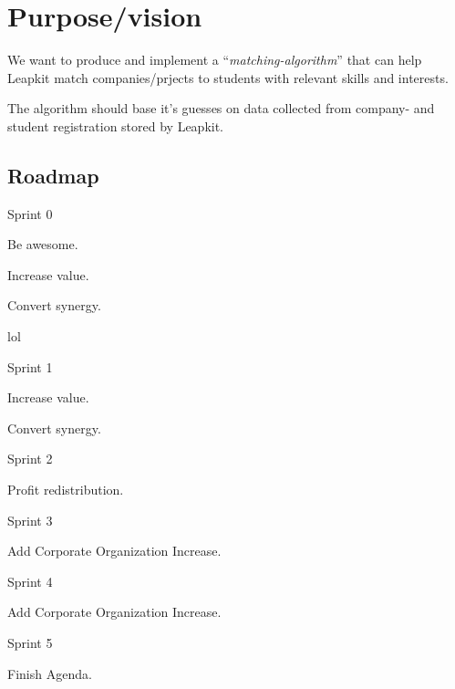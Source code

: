 \section{Purpose/vision}

We want to produce and implement a ``\emph{matching-algorithm}'' that can help
Leapkit match companies/prjects to students with relevant skills and interests.

The algorithm should base it's guesses on data collected from company- and student registration stored by Leapkit.

\subsection{Roadmap}
\begin{itemize*}
  \item Sprint 0
        \begin{enumerate*}
          \item Be awesome.
          \item Increase value.
          \item Convert synergy.
          \item lol
        \end{enumerate*}
  \item Sprint 1
        \begin{enumerate*}
          \item Increase value.
          \item Convert synergy.
        \end{enumerate*}
  \item Sprint 2
        \begin{enumerate*}
          \item Profit redistribution.
        \end{enumerate*}
  \item Sprint 3
        \begin{enumerate*}
          \item Add Corporate Organization Increase.
        \end{enumerate*}
  \item Sprint 4
        \begin{enumerate*}
          \item Add Corporate Organization Increase.
        \end{enumerate*}
  \item Sprint 5
        \begin{enumerate*}
          \item Finish Agenda.
        \end{enumerate*}
\end{itemize*}
